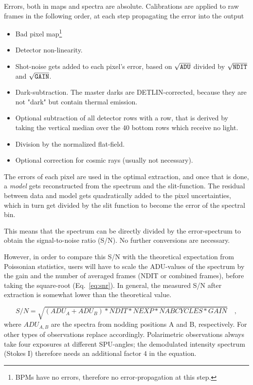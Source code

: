 Errors, both in maps and spectra are absolute. Calibrations are applied to raw
frames in the following order, at each step propagating the error into the
output
\begin{itemize}
    \item Bad pixel map\footnote{BPMs have no errors, therefore no
    error-propagation at this step.}
    \item Detector non-linearity.
    \item Shot-noise gets added to each pixel's error, based on $\sqrt{\verb!ADU!}$
    divided by $\sqrt{\verb!NDIT!}$ and $\sqrt{\verb!GAIN!}$.
    \item Dark-subtraction. The master darks are DETLIN-corrected, because they
    are not "dark" but contain thermal emission.
    \item Optional subtraction of all detector rows with a row, that is derived
    by taking the vertical median over the 40 bottom rows which receive no
    light.
    \item Division by the normalized flat-field.
    \item Optional correction for cosmic rays (usually not necessary).
\end{itemize}


The errors of each pixel are used in the optimal extraction, and once that is
done, a \emph{model} gets reconstructed from the spectrum and the slit-function.
The residual between data and model gets quadratically added to the pixel
uncertainties, which in turn get divided by the slit function to become the
error of the spectral bin.

This means that the spectrum can be directly divided by the error-spectrum to
obtain the signal-to-noise ratio (S/N). No further conversions are necessary.

However, in order to compare this S/N with the theoretical expectation from
Poissonian statistics, users will have to scale the ADU-values of the spectrum
by the gain and the number of averaged frames (NDIT or combined frames), before
taking the square-root (Eq.~\ref{eq:snr}). In general, the measured S/N after extraction is
somewhat lower than the theoretical value.

\begin{equation}
    \label{eq:snr}
    S/N = \sqrt{(ADU_A+ADU_B)*NDIT*NEXP*NABCYCLES*GAIN}\quad ,
\end{equation}
where $ADU_{A,B}$ are the spectra from nodding positions A and B, respectively.
For other types of observations replace accordingly. Polarimetric observations
always take four exposures at different SPU-angles; the demodulated intensity
spectrum (Stokes I) therefore needs an additional factor 4 in the equation.

